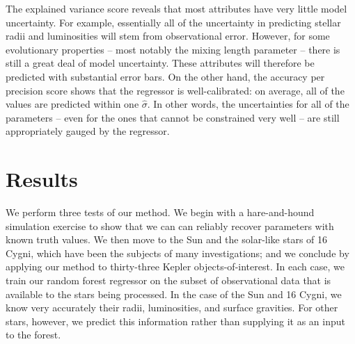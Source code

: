 \documentclass[manuscript]{aastex}
\begin{document}
The explained variance score reveals that most attributes have very little model uncertainty. For example, essentially all of the uncertainty in predicting stellar radii and luminosities will stem from observational error. However, for some evolutionary properties -- most notably the mixing length parameter -- there is still a great deal of model uncertainty. These attributes will therefore be predicted with substantial error bars. On the other hand, the accuracy per precision score shows that the regressor is well-calibrated: on average, all of the values are predicted within one $\hat\sigma$. In other words, the uncertainties for all of the parameters -- even for the ones that cannot be constrained very well -- are still appropriately gauged by the regressor. 

\section{Results}
We perform three tests of our method. We begin with a hare-and-hound simulation exercise to show that we can can reliably recover parameters with known truth values. We then move to the Sun and the solar-like stars of 16 Cygni, which have been the subjects of many investigations; and we conclude by applying our method to thirty-three Kepler objects-of-interest. In each case, we train our random forest regressor on the subset of observational data that is available to the stars being processed. In the case of the Sun and 16 Cygni, we know very accurately their radii, luminosities, and surface gravities. For other stars, however, we predict this information rather than supplying it as an input to the forest. 


\end{document}
